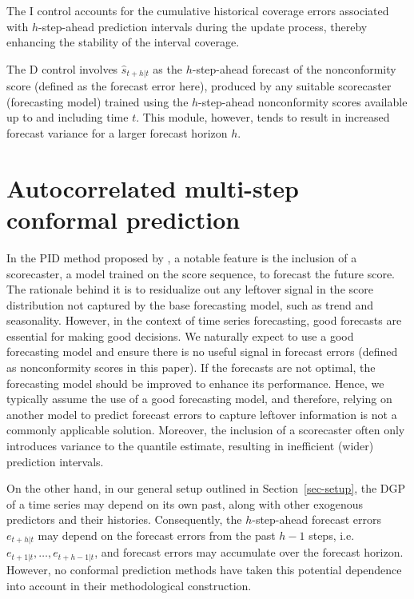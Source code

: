 \documentclass[
  11pt,
  a4paper,
]{article}
\theoremstyle{plain}
\theoremstyle{remark}
\begin{document}
The I control accounts for the cumulative historical coverage errors
associated with \(h\)-step-ahead prediction intervals during the update
process, thereby enhancing the stability of the interval coverage.

The D control involves \(\hat{s}_{t+h|t}\) as the \(h\)-step-ahead
forecast of the nonconformity score (defined as the forecast error
here), produced by any suitable scorecaster (forecasting model) trained
using the \(h\)-step-ahead nonconformity scores available up to and
including time \(t\). This module, however, tends to result in increased
forecast variance for a larger forecast horizon \(h\).

\section{Autocorrelated multi-step conformal
prediction}\label{sec-acmcp}

In the PID method proposed by \textcite{angelopoulos2024}, a notable
feature is the inclusion of a scorecaster, a model trained on the score
sequence, to forecast the future score. The rationale behind it is to
residualize out any leftover signal in the score distribution not
captured by the base forecasting model, such as trend and seasonality.
However, in the context of time series forecasting, good forecasts are
essential for making good decisions. We naturally expect to use a good
forecasting model and ensure there is no useful signal in forecast
errors (defined as nonconformity scores in this paper). If the forecasts
are not optimal, the forecasting model should be improved to enhance its
performance. Hence, we typically assume the use of a good forecasting
model, and therefore, relying on another model to predict forecast
errors to capture leftover information is not a commonly applicable
solution. Moreover, the inclusion of a scorecaster often only introduces
variance to the quantile estimate, resulting in inefficient (wider)
prediction intervals.

On the other hand, in our general setup outlined in
Section~\ref{sec-setup}, the DGP of a time series may depend on its own
past, along with other exogenous predictors and their histories.
Consequently, the \(h\)-step-ahead forecast errors \(e_{t+h|t}\) may
depend on the forecast errors from the past \(h-1\) steps,
i.e.~\(e_{t+1|t}, \ldots, e_{t+h-1|t}\), and forecast errors may
accumulate over the forecast horizon. However, no conformal prediction
methods have taken this potential dependence into account in their
methodological construction.
\end{document}
